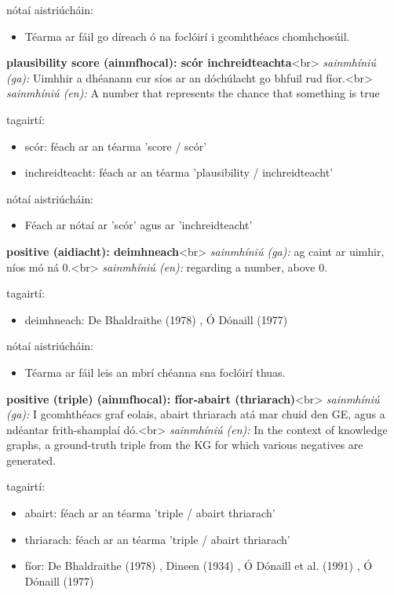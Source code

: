 \documentclass{article}
\begin{document}
nótaí aistriúcháin:
\begin{itemize}
	\item Téarma ar fáil go díreach ó na foclóirí i gcomhthéacs chomhchosúil.
\end{itemize}


\textbf{plausibility score (ainmfhocal): scór inchreidteachta}<br>
\textit{sainmhíniú (ga):} Uimhhir a dhéanann cur síos ar an dóchúlacht go bhfuil rud fíor.<br>
\textit{sainmhíniú (en):} A number that represents the chance that something is true

tagairtí:
\begin{itemize}
	\item scór: féach ar an téarma 'score / scór'
	\item inchreidteacht: féach ar an téarma 'plausibility / inchreidteacht'
\end{itemize}

nótaí aistriúcháin:
\begin{itemize}
	\item Féach ar nótaí ar 'scór' agus ar 'inchreidteacht'
\end{itemize}


\textbf{positive (aidiacht): deimhneach}<br>
\textit{sainmhíniú (ga):} ag caint ar uimhir, níos mó ná 0.<br>
\textit{sainmhíniú (en):} regarding a number, above 0.

tagairtí:
\begin{itemize}
	\item deimhneach: De Bhaldraithe (1978) \cite{de-bhaldraithe}, Ó Dónaill (1977) \cite{odonaill}
\end{itemize}

nótaí aistriúcháin:
\begin{itemize}
	\item Téarma ar fáil leis an mbrí chéanna sna foclóirí thuas.
\end{itemize}


\textbf{positive (triple) (ainmfhocal): fíor-abairt (thriarach)}<br>
\textit{sainmhíniú (ga):} I gcomhthéacs graf eolais, abairt thriarach atá mar chuid den GE, agus a ndéantar frith-shamplaí dó.<br>
\textit{sainmhíniú (en):} In the context of knowledge graphs, a ground-truth triple from the KG for which various negatives are generated.

tagairtí:
\begin{itemize}
	\item abairt: féach ar an téarma 'triple / abairt thriarach'
	\item thriarach: féach ar an téarma 'triple / abairt thriarach'
	\item fíor: De Bhaldraithe (1978) \cite{de-bhaldraithe}, Dineen (1934) \cite{dineen}, Ó Dónaill et al. (1991) \cite{focloir-beag}, Ó Dónaill (1977) \cite{odonaill}
\end{itemize}
\end{document}
